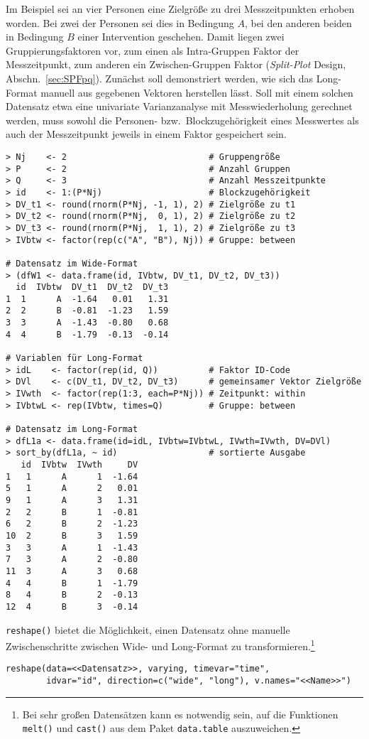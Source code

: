 Im Beispiel sei an vier Personen eine Zielgröße zu drei Messzeitpunkten erhoben worden. Bei zwei der Personen sei dies in Bedingung $A$, bei den anderen beiden in Bedingung $B$ einer Intervention geschehen. Damit liegen zwei Gruppierungsfaktoren vor, zum einen als Intra-Gruppen Faktor der Messzeitpunkt, zum anderen ein Zwischen-Gruppen Faktor (\emph{Split-Plot} Design, Abschn.\ \ref{sec:SPFpq}). Zunächst soll demonstriert werden, wie sich das Long-Format manuell aus gegebenen Vektoren herstellen lässt. Soll mit einem solchen Datensatz etwa eine univariate Varianzanalyse mit Messwiederholung gerechnet werden, muss sowohl die Personen- bzw.\ Blockzugehörigkeit eines Messwertes als auch der Messzeitpunkt jeweils in einem Faktor gespeichert sein.
\begin{lstlisting}
> Nj    <- 2                            # Gruppengröße
> P     <- 2                            # Anzahl Gruppen
> Q     <- 3                            # Anzahl Messzeitpunkte
> id    <- 1:(P*Nj)                     # Blockzugehörigkeit
> DV_t1 <- round(rnorm(P*Nj, -1, 1), 2) # Zielgröße zu t1
> DV_t2 <- round(rnorm(P*Nj,  0, 1), 2) # Zielgröße zu t2
> DV_t3 <- round(rnorm(P*Nj,  1, 1), 2) # Zielgröße zu t3
> IVbtw <- factor(rep(c("A", "B"), Nj)) # Gruppe: between

# Datensatz im Wide-Format
> (dfW1 <- data.frame(id, IVbtw, DV_t1, DV_t2, DV_t3))
  id  IVbtw  DV_t1  DV_t2  DV_t3
1  1      A  -1.64   0.01   1.31
2  2      B  -0.81  -1.23   1.59
3  3      A  -1.43  -0.80   0.68
4  4      B  -1.79  -0.13  -0.14

# Variablen für Long-Format
> idL    <- factor(rep(id, Q))          # Faktor ID-Code
> DVl    <- c(DV_t1, DV_t2, DV_t3)      # gemeinsamer Vektor Zielgröße
> IVwth  <- factor(rep(1:3, each=P*Nj)) # Zeitpunkt: within
> IVbtwL <- rep(IVbtw, times=Q)         # Gruppe: between

# Datensatz im Long-Format
> dfL1a <- data.frame(id=idL, IVbtw=IVbtwL, IVwth=IVwth, DV=DVl)
> sort_by(dfL1a, ~ id)                  # sortierte Ausgabe
   id  IVbtw  IVwth     DV
1   1      A      1  -1.64
5   1      A      2   0.01
9   1      A      3   1.31
2   2      B      1  -0.81
6   2      B      2  -1.23
10  2      B      3   1.59
3   3      A      1  -1.43
7   3      A      2  -0.80
11  3      A      3   0.68
4   4      B      1  -1.79
8   4      B      2  -0.13
12  4      B      3  -0.14
\end{lstlisting}

\lstinline!reshape()! bietet die Möglichkeit, einen Datensatz ohne manuelle Zwischenschritte zwischen Wide- und Long-Format zu transformieren.\footnote{\label{ftn:melt_cast}Bei sehr großen Datensätzen kann es notwendig sein, auf die Funktionen \lstinline!melt()! und \lstinline!cast()! aus dem Paket \lstinline!data.table! auszuweichen.}
\begin{lstlisting}
reshape(data=<<Datensatz>>, varying, timevar="time",
        idvar="id", direction=c("wide", "long"), v.names="<<Name>>")
\end{lstlisting}

